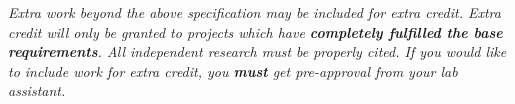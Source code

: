 \documentclass[11pt]{cselabheader}
\begin{document}
\textit{Extra work beyond the above specification may be included for extra credit. Extra credit will only be granted to projects which have \textbf{completely fulfilled the base requirements}. All independent research must be properly cited. If you would like to include work for extra credit, you \textbf{must} get pre-approval from your lab assistant.}
\end{document}
